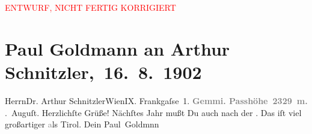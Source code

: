 
\begin{center}
            \textcolor{red}{ENTWURF, NICHT FERTIG KORRIGIERT}
                      \end{center}
            
         \renewcommand{\erwaehnteOrte}{Orte: Frankgasse, Gemmipass, Leukerbad, Schweiz, Südtirol, Tirol, Wien}
         \renewcommand{\erwaehnteWerke}{}
               \section[ Paul Goldmann an Arthur Schnitzler, 16. 8. 1902]{ Paul Goldmann an Arthur Schnitzler, 16. 8. 1902}\nopagebreak{}\rehead{ }\begin{ledgroupsized}[t]{13cm}\normalsize\beginnumbering \toendnotes[C]{\smallbreak\pagebreak[2]} 
\toendnotes[C]{\smallbreak}\pstart{}{\pb}Herrn\pend{}\pstart{}Dr. Arthur Schnitzler\pend{}\pstart{}Wien\pend{}\pstart{}IX. Frankgaſse 1.\pend{}{\bigskip}\pstart
           \noindent{}\centering{}{\pb}\textcolor{gray}{\textbf{\textbf{Gemmi}. Passhöhe 2329 m.}}\pend
           . Auguſt.\pend
           \pstart
           Herzlichſte Grüße! Nächſtes Jahr mußt Du auch nach der \label{K_L03220-1v}\label{K_L03220-1h}. Das iſt viel
               großartiger \textcolor{gray}{a}ls Tirol.\pend
           \pstart Dein \spacefill\mbox{Paul Goldmnn}\pend{}
         
         \endnumbering{}\end{ledgroupsized}  \newcommand{\dateiname}{L03220}\newcommand{\titel}{Paul Goldmann an Arthur Schnitzler, 16. 8. 1902}\newcommand{\editorInnen}{Martin Anton Müller und Laura Untner}
      